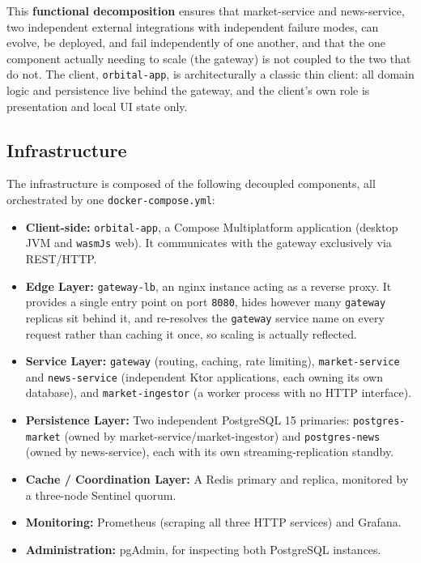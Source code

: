 \documentclass{scrartcl}
\begin{document}
This \textbf{functional decomposition} ensures that market-service and news-service, two
independent external integrations with independent failure modes, can evolve, be deployed, and
fail independently of one another, and that the one component actually needing to scale (the
gateway) is not coupled to the two that do not. The client, \texttt{orbital-app}, is
architecturally a classic thin client: all domain logic and persistence live behind the gateway,
and the client's own role is presentation and local UI state only.

\subsection{Infrastructure}\label{infrastructure}

The infrastructure is composed of the following decoupled components, all orchestrated by one
\texttt{docker-compose.yml}:

\begin{itemize}
  \item \textbf{Client-side:} \texttt{orbital-app}, a Compose Multiplatform application (desktop
  JVM and \texttt{wasmJs} web). It communicates with the gateway exclusively via REST/HTTP.
  \item \textbf{Edge Layer:} \texttt{gateway-lb}, an nginx instance acting as a reverse proxy. It
  provides a single entry point on port \texttt{8080}, hides however many \texttt{gateway}
  replicas sit behind it, and re-resolves the \texttt{gateway} service name on every request
  rather than caching it once, so scaling is actually reflected.
  \item \textbf{Service Layer:} \texttt{gateway} (routing, caching, rate limiting),
  \texttt{market-service} and \texttt{news-service} (independent Ktor applications, each owning
  its own database), and \texttt{market-ingestor} (a worker process with no HTTP interface).
  \item \textbf{Persistence Layer:} Two independent PostgreSQL 15 primaries:
  \texttt{postgres-market} (owned by market-service/market-ingestor) and \texttt{postgres-news}
  (owned by news-service), each with its own streaming-replication standby.
  \item \textbf{Cache / Coordination Layer:} A Redis primary and replica, monitored by a
  three-node Sentinel quorum.
  \item \textbf{Monitoring:} Prometheus (scraping all three HTTP services) and Grafana.
  \item \textbf{Administration:} pgAdmin, for inspecting both PostgreSQL instances.
\end{itemize}
\end{document}
